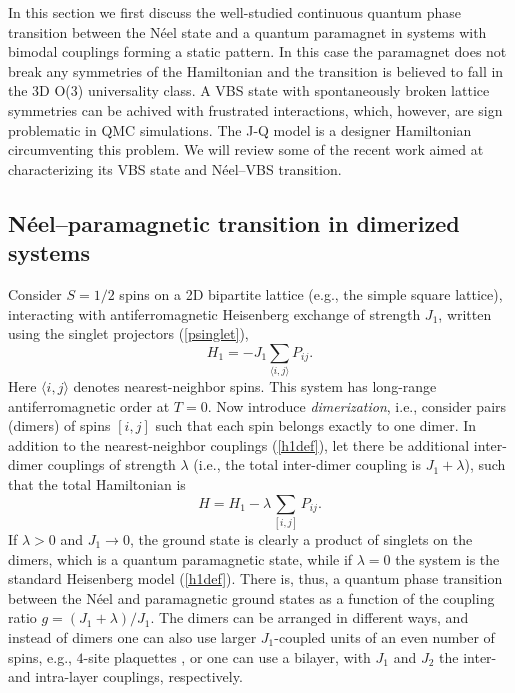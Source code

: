 \documentclass[range]{ar2e}
\begin{document}
In this section we first discuss the well-studied continuous quantum phase transition between the N\'eel state and a quantum paramagnet in systems 
with bimodal couplings forming a static pattern. In this case the paramagnet does not break any symmetries of the Hamiltonian and the transition 
is believed to fall in the 3D O($3$) universality class. A VBS state with spontaneously broken lattice symmetries can be achived with frustrated 
interactions, which, however, are sign problematic in QMC simulations. The J-Q model \cite{Sandvik07} is a designer Hamiltonian circumventing this 
problem. We will review some of the recent work aimed at characterizing its VBS state and  N\'eel--VBS transition.

\subsection{N\'eel--paramagnetic transition in dimerized systems}

Consider $S=1/2$ spins on a 2D bipartite lattice (e.g., the simple square lattice), interacting with antiferromagnetic Heisenberg exchange of 
strength $J_1$, written using the singlet projectors (\ref{psinglet}),
\begin{equation}
H_1 = -J_1 \sum_{\langle i,j\rangle} P_{ij}.
\label{h1def}
\end{equation}
Here $\langle i,j\rangle$ denotes nearest-neighbor spins. This system has long-range antiferromagnetic order at $T=0$. Now introduce {\it dimerization}, 
i.e., consider pairs (dimers) of spins $[i,j]$ such that each spin belongs exactly to one dimer. In addition to the nearest-neighbor couplings (\ref{h1def}),
let there be additional inter-dimer couplings of strength $\lambda$ (i.e., the total inter-dimer coupling is $J_1+\lambda$), such that the total Hamiltonian is
\begin{equation}
H = H_1  -\lambda \sum_{[ i,j]} P_{ij} .
\end{equation}
If $\lambda>0$ and $J_1\to 0$, the ground state is clearly a product of singlets on the dimers, which is a quantum paramagnetic state, while if $\lambda=0$ 
the system is the standard Heisenberg model (\ref{h1def}). There is, thus, a quantum phase transition between the N\'eel and paramagnetic ground states as a 
function of the coupling ratio $g=(J_1+\lambda)/J_1$. The dimers can be arranged in different ways, and instead of dimers one can also use larger $J_1$-coupled 
units of an even number of spins, e.g., $4$-site plaquettes , or one can use a bilayer, with $J_1$ and $J_2$ the inter-and intra-layer couplings, respectively.
\end{document}
